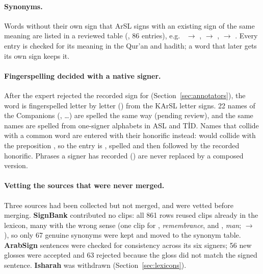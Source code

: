 \paragraph{Synonyms.} Words without their own sign that ArSL signs with an existing sign of the same meaning are listed in a
reviewed table (, 86 entries), e.g.\  $\to$ ,  $\to$ ,
 $\to$ . Every entry is checked for its meaning in the Qur'an and hadith; a word that later gets its own sign keeps it.

\paragraph{Fingerspelling decided with a native signer.} After the expert rejected the recorded sign for 
(Section~\ref{sec:annotators}), the word is fingerspelled letter by letter () from the KArSL letter signs. 22 names of
the Companions (, \ldots) are spelled the same way (pending review), and the same
names are spelled from one-signer alphabets in ASL and T\.{I}D. Names that collide with a common word are entered with their
honorific instead:  would collide with the preposition , so the entry is , spelled and then followed by
the recorded honorific. Phrases a signer has recorded () are never replaced by a composed version.

\paragraph{Vetting the sources that were never merged.} Three sources had been collected but not merged, and were vetted before
merging. \textbf{SignBank} contributed no clips: all 861 rows reused clips already in the lexicon, many with the wrong sense (one clip
for , \emph{remembrance}, and , \emph{man};  $\to$ ), so only 67 genuine synonyms were kept and moved to
the synonym table. \textbf{ArabSign} sentences were checked for consistency across its six signers; 56 new glosses were accepted and
63 rejected because the gloss did not match the signed sentence. \textbf{Isharah} was withdrawn (Section~\ref{sec:lexicons}).

